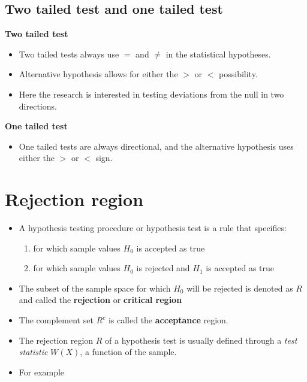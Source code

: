 \documentclass[]{book}
\providecommand{\tightlist}{%
  \setlength{\itemsep}{0pt}\setlength{\parskip}{0pt}}
\begin{document}
\hypertarget{two-tailed-test-and-one-tailed-test}{%
\subsection{Two tailed test and one tailed test}\label{two-tailed-test-and-one-tailed-test}}

\textbf{Two tailed test}

\begin{itemize}
\tightlist
\item
  Two tailed tests always use \(=\) and \(\neq\) in the statistical hypotheses.
\item
  Alternative hypothesis allows for either the \(>\) or \(<\) possibility.
\item
  Here the research is interested in testing deviations from the null in two directions.
\end{itemize}

\textbf{One tailed test}

\begin{itemize}
\tightlist
\item
  One tailed tests are always directional, and the alternative hypothesis uses either the \(>\) or \(<\) sign.
\end{itemize}

\hypertarget{rejection-region}{%
\section{Rejection region}\label{rejection-region}}

\begin{itemize}
\item
  A hypothesis testing procedure or hypothesis test is a rule that specifies:

  \begin{enumerate}
  \def\labelenumi{\roman{enumi})}
  \tightlist
  \item
    for which sample values \(H_0\) is accepted as true
  \item
    for which sample values \(H_0\) is rejected and \(H_1\) is accepted as true
  \end{enumerate}
\item
  The subset of the sample space for which \(H_0\) will be rejected is denoted as \(R\) and called the \textbf{rejection} or \textbf{critical region}
\item
  The complement set \(R^c\) is called the \textbf{acceptance} region.
\item
  The rejection region \(R\) of a hypothesis test is usually defined through a \emph{test statistic} \(W(X)\), a function of the sample.
\item
  For example
\end{itemize}
\end{document}
